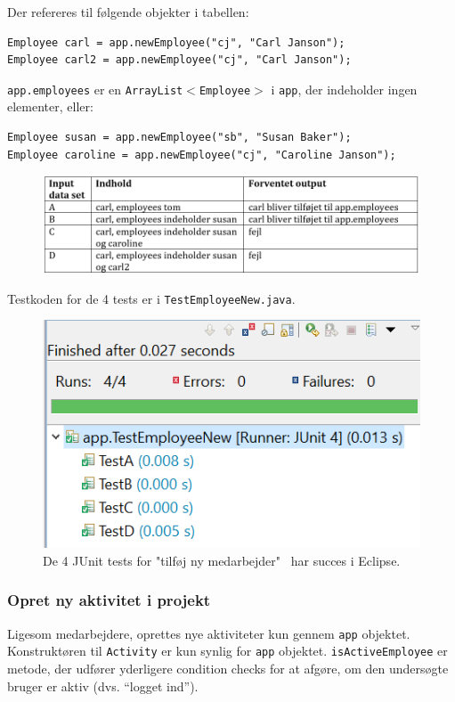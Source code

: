 Der refereres til følgende objekter i tabellen:
\begin{lstlisting}
Employee carl = app.newEmployee("cj", "Carl Janson");
Employee carl2 = app.newEmployee("cj", "Carl Janson");
\end{lstlisting}

\texttt{app.employees} er en \texttt{ArrayList}$<$\texttt{Employee}$>$ i \texttt{app}, der indeholder ingen elementer, eller:
\begin{lstlisting}
Employee susan = app.newEmployee("sb", "Susan Baker");
Employee caroline = app.newEmployee("cj", "Caroline Janson");
\end{lstlisting}

\begin{figure}[H]
    \centering
    \includegraphics[width = \textwidth]{Figurer/whitebox1b.PNG}
    \label{fig:whitebox1b}
\end{figure}

Testkoden for de 4 tests er i \texttt{TestEmployeeNew.java}.

\begin{figure}[H]
    \centering
    \includegraphics[width = 0.5 \textwidth]{Figurer/whitebox1succes.PNG}
    \caption{De 4 JUnit tests for "tilføj ny medarbejder" $\,$ har succes i Eclipse.}
    \label{fig:whitebox1succes}
\end{figure}




\subsubsection{Opret ny aktivitet i projekt}

Ligesom medarbejdere, oprettes nye aktiviteter kun gennem \texttt{app} objektet.
Konstruktøren til \texttt{Activity} er kun synlig for \texttt{app} objektet. \texttt{isActiveEmployee} er metode, der udfører yderligere condition checks for at afgøre, om den undersøgte bruger er aktiv (dvs. “logget ind”).

